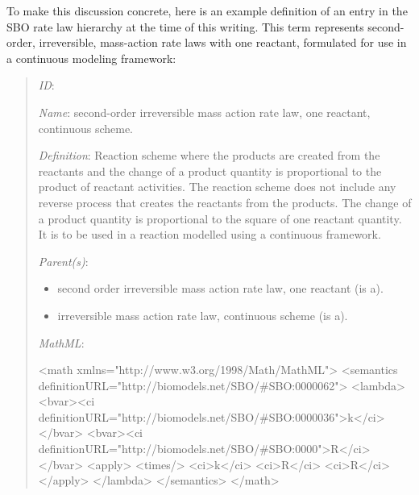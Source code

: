 To make this discussion concrete, here is an example definition of
an entry in the SBO rate law hierarchy at the time of this
writing.  This term represents second-order, irreversible,
mass-action rate laws with one reactant, formulated for use in a
continuous modeling framework:
\begin{quote}
\begin{description}

\item \emph{ID}: 

\item \emph{Name}: second-order irreversible mass action rate law,
  one reactant, continuous scheme.

\item \emph{Definition}: Reaction scheme where the products are
  created from the reactants and the change of a product quantity
  is proportional to the product of reactant activities. The
  reaction scheme does not include any reverse process that
  creates the reactants from the products. The change of a product
  quantity is proportional to the square of one reactant quantity.
  It is to be used in a reaction modelled using a continuous
  framework.

\item \emph{Parent(s)}: 
  \begin{itemize}
  \item {} second order irreversible mass action
    rate law, one reactant (is a).
  \item {}
    irreversible mass action rate law, continuous scheme (is a).
  \end{itemize}
  
\item \emph{MathML}:
\begin{example}
<math xmlns="http://www.w3.org/1998/Math/MathML">
   <semantics definitionURL="http://biomodels.net/SBO/#SBO:0000062">
      <lambda>
         <bvar><ci definitionURL="http://biomodels.net/SBO/#SBO:0000036">k</ci></bvar>
         <bvar><ci definitionURL="http://biomodels.net/SBO/#SBO:0000">R</ci></bvar>
         <apply>
            <times/>
            <ci>k</ci>
            <ci>R</ci>
            <ci>R</ci>
         </apply>
      </lambda>
   </semantics>
</math>
\end{example}

\end{description}
\end{quote}

